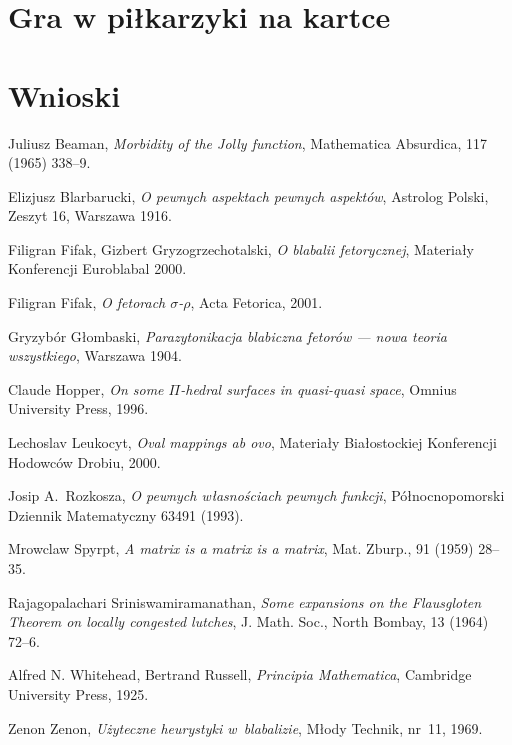 \documentclass[licencjacka]{pracamgr}
\begin{document}
\chapter{Gra w piłkarzyki na kartce}

\chapter{Wnioski}

\begin{thebibliography}{99}

 Juliusz Beaman, \textit{Morbidity of the Jolly
    function}, Mathematica Absurdica, 117 (1965) 338--9.

 Elizjusz Blarbarucki, \textit{O pewnych
    aspektach pewnych aspektów}, Astrolog Polski, Zeszyt 16, Warszawa
  1916.

 Filigran Fifak, Gizbert Gryzogrzechotalski,
  \textit{O blabalii fetorycznej}, Materiały Konferencji Euroblabal
  2000.

 Filigran Fifak, \textit{O fetorach
    $\sigma$-$\rho$}, Acta Fetorica, 2001.

 Gryzybór Głombaski, \textit{Parazytonikacja
    blabiczna fetorów --- nowa teoria wszystkiego}, Warszawa 1904.

 Claude Hopper, \textit{On some $\Pi$-hedral
    surfaces in quasi-quasi space}, Omnius University Press, 1996.

 Lechoslav Leukocyt, \textit{Oval mappings ab ovo},
  Materiały Białostockiej Konferencji Hodowców Drobiu, 2000.

 Josip A.~Rozkosza, \textit{O pewnych własnościach
    pewnych funkcji}, Północnopomorski Dziennik Matematyczny 63491
  (1993).

 Mrowclaw Spyrpt, \textit{A matrix is a matrix
    is a matrix}, Mat. Zburp., 91 (1959) 28--35.

 Rajagopalachari Sriniswamiramanathan,
  \textit{Some expansions on the Flausgloten Theorem on locally
    congested lutches}, J. Math.  Soc., North Bombay, 13 (1964) 72--6.

 Alfred N. Whitehead, Bertrand Russell,
  \textit{Principia Mathematica}, Cambridge University Press, 1925.

 Zenon Zenon, \textit{Użyteczne heurystyki
    w~blabalizie}, Młody Technik, nr~11, 1969.

\end{thebibliography}
\end{document}
